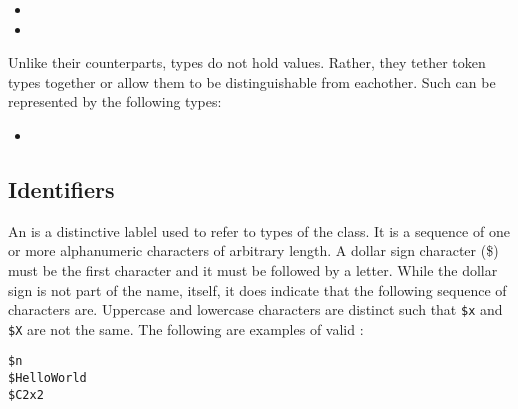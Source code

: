 \begin{itemize}
    \item {}
    \item {}
\end{itemize}

Unlike their counterparts,  types do not hold values. 
Rather, they tether  token types together or allow them to 
be distinguishable from eachother. Such  can be 
represented by the following types:

\begin{itemize}
    \item {}
\end{itemize}

\subsection{Identifiers}

An  is a distinctive lablel used to refer to 
 types of the  class. It is a 
sequence of one or more alphanumeric characters of arbitrary length. A dollar 
sign character (\$) must be the first character and it must be followed by a 
letter. While the dollar sign is not part of the  
name, itself, it does indicate that the following sequence of 
 characters are. Uppercase and lowercase characters are 
distinct such that \lstinline[language=grid]!$x! and 
\lstinline[language=grid]!$X! are not the same. The following are examples of 
valid :

\begin{lstlisting}[language=grid]
$n
$HelloWorld
$C2x2
\end{lstlisting}
